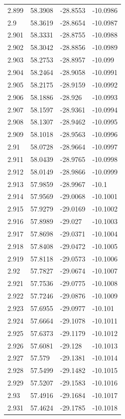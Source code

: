 \begin{tabular}{llll}
2.899 & 58.3908 & -28.8553 & -10.0986 \\
2.9 & 58.3619 & -28.8654 & -10.0987 \\
2.901 & 58.3331 & -28.8755 & -10.0988 \\
2.902 & 58.3042 & -28.8856 & -10.0989 \\
2.903 & 58.2753 & -28.8957 & -10.099 \\
2.904 & 58.2464 & -28.9058 & -10.0991 \\
2.905 & 58.2175 & -28.9159 & -10.0992 \\
2.906 & 58.1886 & -28.926 & -10.0993 \\
2.907 & 58.1597 & -28.9361 & -10.0994 \\
2.908 & 58.1307 & -28.9462 & -10.0995 \\
2.909 & 58.1018 & -28.9563 & -10.0996 \\
2.91 & 58.0728 & -28.9664 & -10.0997 \\
2.911 & 58.0439 & -28.9765 & -10.0998 \\
2.912 & 58.0149 & -28.9866 & -10.0999 \\
2.913 & 57.9859 & -28.9967 & -10.1 \\
2.914 & 57.9569 & -29.0068 & -10.1001 \\
2.915 & 57.9279 & -29.0169 & -10.1002 \\
2.916 & 57.8989 & -29.027 & -10.1003 \\
2.917 & 57.8698 & -29.0371 & -10.1004 \\
2.918 & 57.8408 & -29.0472 & -10.1005 \\
2.919 & 57.8118 & -29.0573 & -10.1006 \\
2.92 & 57.7827 & -29.0674 & -10.1007 \\
2.921 & 57.7536 & -29.0775 & -10.1008 \\
2.922 & 57.7246 & -29.0876 & -10.1009 \\
2.923 & 57.6955 & -29.0977 & -10.101 \\
2.924 & 57.6664 & -29.1078 & -10.1011 \\
2.925 & 57.6373 & -29.1179 & -10.1012 \\
2.926 & 57.6081 & -29.128 & -10.1013 \\
2.927 & 57.579 & -29.1381 & -10.1014 \\
2.928 & 57.5499 & -29.1482 & -10.1015 \\
2.929 & 57.5207 & -29.1583 & -10.1016 \\
2.93 & 57.4916 & -29.1684 & -10.1017 \\
2.931 & 57.4624 & -29.1785 & -10.1018 \\

\end{tabular}
